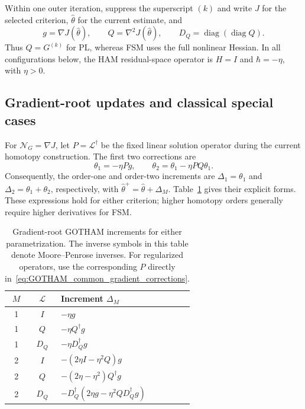 Within one outer iteration, suppress the superscript $(k)$ and write
$J$ for the selected criterion, $\hat\theta$ for the current estimate, and
\begin{equation}
\label{eq:GOTHAM_local_quantities}
    g=\nabla J(\hat\theta),\qquad
    Q=\nabla^2J(\hat\theta),\qquad
    D_Q=\operatorname{diag}(\operatorname{diag}Q).
\end{equation}
Thus $Q=G^{(k)}$ for PL, whereas FSM uses the full nonlinear Hessian.
In all configurations below, the HAM residual-space operator is $H=I$
and $\hbar=-\eta$, with $\eta>0$.

\subsection{Gradient-root updates and classical special cases}
\label{subsec:GOTHAM_PL_gradient_root}
\label{subsec:GOTHAM_update_summary}

For $\mathcal N_G=\nabla J$, let $P=\mathcal L^\dagger$ be the fixed
linear solution operator during the current homotopy construction.
The first two corrections are
\begin{equation}
\label{eq:GOTHAM_common_gradient_corrections}
    \theta_1=-\eta Pg,\qquad
    \theta_2=\theta_1-\eta PQ\theta_1.
\end{equation}
Consequently, the order-one and order-two increments are
$\Delta_1=\theta_1$ and $\Delta_2=\theta_1+\theta_2$, respectively, with
$\hat\theta^{+}=\hat\theta+\Delta_M$.
Table~\ref{tab:GOTHAM_update_rules} gives their explicit forms. These
expressions hold for either criterion; higher homotopy orders generally
require higher derivatives for FSM.

\begin{table}[t]
\centering
\small
\setlength{\tabcolsep}{7pt}
\renewcommand{\arraystretch}{1.45}
\caption{Gradient-root GOTHAM increments for either parametrization.
The inverse symbols in this table denote Moore--Penrose inverses.
For regularized operators, use the corresponding $P$ directly
in~\eqref{eq:GOTHAM_common_gradient_corrections}.}
\label{tab:GOTHAM_update_rules}
\begin{tabular}{@{}ccl@{}}
\toprule
$M$ & $\mathcal L$ & Increment $\Delta_M$\\
\midrule
1 & $I$   & $-\eta g$\\
1 & $Q$   & $-\eta Q^\dagger g$\\
1 & $D_Q$ & $-\eta D_Q^\dagger g$\\
\midrule
2 & $I$   & $-(2\eta I-\eta^2Q)g$\\
2 & $Q$   & $-(2\eta-\eta^2)Q^\dagger g$\\
2 & $D_Q$ & $-D_Q^\dagger(2\eta g-\eta^2QD_Q^\dagger g)$\\
\bottomrule
\end{tabular}
\end{table}

